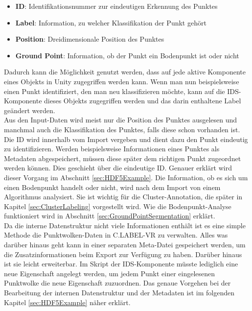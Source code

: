 \begin{itemize}
\item \textbf{ID}: Identifikationsnummer zur eindeutigen Erkennung des Punktes
\item \textbf{Label}: Information, zu welcher Klassifikation der Punkt gehört
\item \textbf{Position}: Dreidimensionale Position des Punktes
\item \textbf{Ground Point}: Information, ob der Punkt ein Bodenpunkt ist oder nicht
\end{itemize}

Dadurch kann die Möglichkeit genutzt werden, dass auf jede aktive Komponente eines Objekts in Unity zugegriffen werden kann. Wenn man nun beispielsweise einen Punkt identifiziert, den man neu klassifizieren möchte, kann auf die IDS-Komponente dieses Objekts zugegriffen werden und das darin enthaltene Label geändert werden.\\

Aus den Input-Daten wird meist nur die Position des Punktes ausgelesen und manchmal auch die Klassifikation des Punktes, falls diese schon vorhanden ist. Die ID wird innerhalb vom Import vergeben und dient dazu den Punkt eindeutig zu identifizieren. Werden beispielsweise Informationen eines Punktes als Metadaten abgespeichert, müssen diese später dem richtigen Punkt zugeordnet werden können. Dies geschieht über die eindeutige ID. Genauer erklärt wird dieser Vorgang im Abschnitt \ref{sec:HDF5Example}. Die Information, ob es sich um einen Bodenpunkt handelt oder nicht, wird nach dem Import von einem Algorithmus analysiert. Sie ist wichtig für die Cluster-Annotation, die später in Kapitel \ref{sec:ClusterLabeling} vorgestellt wird. Wie die Bodenpunkt-Analyse funktioniert wird in Abschnitt \ref{sec:GroundPointSegmentation} erklärt. \\

Da die interne Datenstruktur nicht viele Informationen enthält ist es eine simple Methode die Punktwolken-Daten in C.LABEL-VR zu verwalten. Alles was darüber hinaus geht kann in einer separaten Meta-Datei gespeichert werden, um die Zusatzinformationen beim Export zur Verfügung zu haben. Darüber hinaus ist sie leicht erweiterbar. Im Skript der IDS-Komponente müsste lediglich eine neue Eigenschaft angelegt werden, um jedem Punkt einer eingelesenen Punktwolke die neue Eigenschaft zuzuordnen. Das genaue Vorgehen bei der Bearbeitung der internen Datenstruktur und der Metadaten ist im folgenden Kapitel \ref{sec:HDF5Example} näher erklärt.

